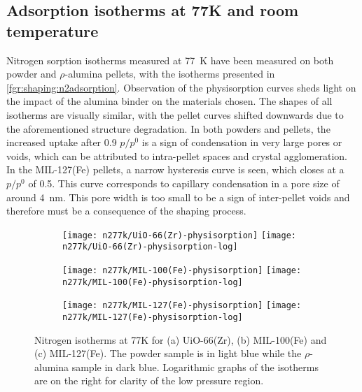 
\subsection{Adsorption isotherms at 77K and room temperature}

Nitrogen sorption isotherms measured at \SI{77}{\kelvin} have been
measured on both powder and \(\rho\)-alumina pellets, with the isotherms
presented in \autoref{fgr:shaping:n2adsorption}.
Observation of the physisorption curves sheds light on the
impact of the alumina binder on the materials chosen.
The shapes of all isotherms are visually similar, with the pellet curves
shifted downwards due to the aforementioned structure degradation.
In both powders and pellets, the increased uptake after 0.9 \(p/p^0\)
is a sign of condensation in very large pores or voids, which can
be attributed to intra-pellet spaces and crystal agglomeration.
In the MIL-127(Fe) pellets, a narrow hysteresis curve is seen,
which closes at a \(p/p^0\) of 0.5. This curve corresponds to
capillary condensation in a pore size of around \SI{4}{\nano\metre}.
This pore width is too small to be a sign of
inter-pellet voids and therefore must be a consequence of the shaping
process.

\begin{figure}[p!]
	\centering

	\begin{subfigure}{\linewidth}
		\centering
		\parbox[c]{0.1\linewidth}{\caption{}\label{fgr:shaping:n277kuio66}}%
		\texttt{[image: n277k/UiO-66(Zr)-physisorption]}%
		\texttt{[image: n277k/UiO-66(Zr)-physisorption-log]}%
	\end{subfigure}

	\begin{subfigure}{\linewidth}
		\centering
		\parbox[c]{0.1\linewidth}{\caption{}\label{fgr:shaping:n277kuio66}}%
		\texttt{[image: n277k/MIL-100(Fe)-physisorption]}%
		\texttt{[image: n277k/MIL-100(Fe)-physisorption-log]}%
	\end{subfigure}

	\begin{subfigure}{\linewidth}
		\centering
		\parbox[c]{0.1\linewidth}{\caption{}\label{fgr:shaping:n277kmil127}}%
		\texttt{[image: n277k/MIL-127(Fe)-physisorption]}%
		\texttt{[image: n277k/MIL-127(Fe)-physisorption-log]}%
		\label{fgr:shaping:n277kmil127}
	\end{subfigure}

	\caption{Nitrogen isotherms at 77K for (a) UiO-66(Zr),
		(b) MIL-100(Fe) and (c) MIL-127(Fe). The powder sample is in light
		blue while the \(\rho\)-alumina sample in dark blue. Logarithmic
		graphs of the isotherms are on the right for clarity of the low
		pressure region.}%
	\label{fgr:shaping:n2adsorption}
\end{figure}

